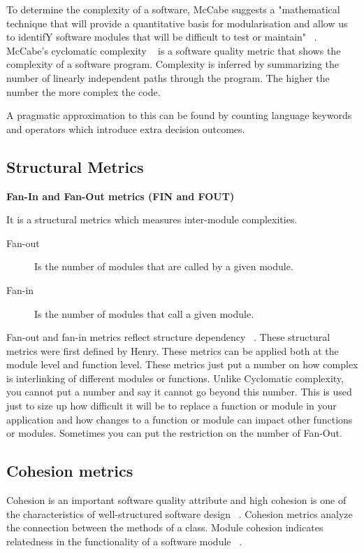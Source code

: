 To determine the complexity of a software, McCabe suggests a "mathematical technique that will provide a quantitative basis for modularisation and allow us to identifY software modules that will be difficult to test or maintain" ~\cite{shepperd}. McCabe's cyclomatic complexity ~\cite{mc} is a software quality metric that shows the complexity of a software program. Complexity is inferred by summarizing the number of linearly independent paths through the program. The higher the number the more complex the code.

A pragmatic approximation to this can be found by counting language keywords and operators which introduce extra decision outcomes.
\subsection{Structural Metrics}

\textbf{Fan-In and Fan-Out metrics (FIN and FOUT)}

It is a structural metrics which measures inter-module complexities. 
\begin{description}
	\item[Fan-out] Is the number of modules that are called by a given module.
	\item[Fan-in] Is the number of modules that call a given module.
\end{description}

Fan-out and fan-in metrics reflect structure dependency ~\cite{fanin}.
These structural metrics were first defined by Henry.
These metrics can be applied both at the module level and function level. These metrics just put a number on how complex is interlinking of different modules or functions. Unlike Cyclomatic complexity, you cannot put a number and say it cannot go beyond this number. This is used just to size up how difficult it will be to replace a function or module in your application and how changes to a function or module can impact other functions or modules. Sometimes you can put the restriction on the number of Fan-Out.


\subsection{Cohesion metrics}
Cohesion is an important software quality attribute and high cohesion is one of the characteristics of well-structured software design ~\cite{cohesion}.
Cohesion metrics analyze the connection between the methods of a class.
Module cohesion indicates relatedness in the functionality of a software module ~\cite{cohesion2}.

